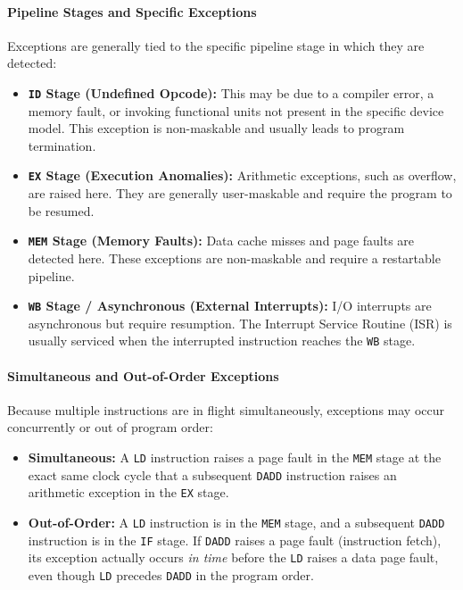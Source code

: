 \paragraph{Pipeline Stages and Specific Exceptions}
Exceptions are generally tied to the specific pipeline stage in which they are detected:
\begin{itemize}
    \item \textbf{\texttt{ID} Stage (Undefined Opcode):} This may be due to a compiler error, a memory fault, or invoking functional units not present in the specific device model. This exception is non-maskable and usually leads to program termination.
    \item \textbf{\texttt{EX} Stage (Execution Anomalies):} Arithmetic exceptions, such as overflow, are raised here. They are generally user-maskable and require the program to be resumed.
    \item \textbf{\texttt{MEM} Stage (Memory Faults):} Data cache misses and page faults are detected here. These exceptions are non-maskable and require a restartable pipeline.
    \item \textbf{\texttt{WB} Stage / Asynchronous (External Interrupts):} I/O interrupts are asynchronous but require resumption. The Interrupt Service Routine (ISR) is usually serviced when the interrupted instruction reaches the \texttt{WB} stage.
\end{itemize}

\paragraph{Simultaneous and Out-of-Order Exceptions}
Because multiple instructions are in flight simultaneously, exceptions may occur concurrently or out of program order:
\begin{itemize}
    \item \textbf{Simultaneous:} A \texttt{LD} instruction raises a page fault in the \texttt{MEM} stage at the exact same clock cycle that a subsequent \texttt{DADD} instruction raises an arithmetic exception in the \texttt{EX} stage.
    \item \textbf{Out-of-Order:} A \texttt{LD} instruction is in the \texttt{MEM} stage, and a subsequent \texttt{DADD} instruction is in the \texttt{IF} stage. If \texttt{DADD} raises a page fault (instruction fetch), its exception actually occurs \textit{in time} before the \texttt{LD} raises a data page fault, even though \texttt{LD} precedes \texttt{DADD} in the program order.
\end{itemize}

